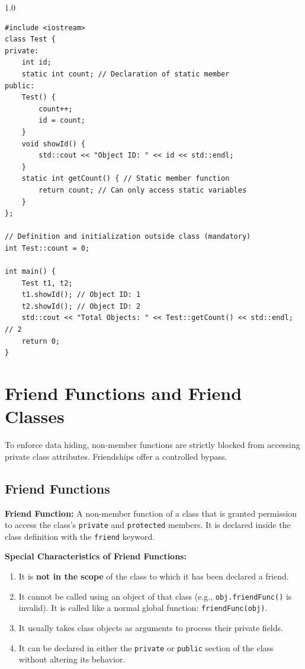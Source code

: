 \documentclass[12pt,a4paper]{article}
\begin{document}
\begin{tcolorbox}[examplebox, title={Code Example: Tracking Object Counts using Static Members}]
\begin{spacing}{1.0}
\begin{verbatim}
#include <iostream>
class Test {
private:
    int id;
    static int count; // Declaration of static member
public:
    Test() {
        count++;
        id = count;
    }
    void showId() {
        std::cout << "Object ID: " << id << std::endl;
    }
    static int getCount() { // Static member function
        return count; // Can only access static variables
    }
};

// Definition and initialization outside class (mandatory)
int Test::count = 0;

int main() {
    Test t1, t2;
    t1.showId(); // Object ID: 1
    t2.showId(); // Object ID: 2
    std::cout << "Total Objects: " << Test::getCount() << std::endl; // 2
    return 0;
}
\end{verbatim}
\end{spacing}
\end{tcolorbox}

\section{Friend Functions and Friend Classes}

To enforce data hiding, non-member functions are strictly blocked from accessing private class attributes. Friendships offer a controlled bypass.

\subsection{Friend Functions}
\begin{tcolorbox}[defbox]
\textbf{Friend Function:} A non-member function of a class that is granted permission to access the class's \texttt{private} and \texttt{protected} members. It is declared inside the class definition with the \texttt{friend} keyword.
\end{tcolorbox}

\textbf{Special Characteristics of Friend Functions:}
\begin{enumerate}[label=\textbf{\alph*.}, leftmargin=1.5em, itemsep=2pt]
  \item It is \textbf{not in the scope} of the class to which it has been declared a friend.
  \item It cannot be called using an object of that class (e.g., \texttt{obj.friendFunc()} is invalid). It is called like a normal global function: \texttt{friendFunc(obj)}.
  \item It usually takes class objects as arguments to process their private fields.
  \item It can be declared in either the \texttt{private} or \texttt{public} section of the class without altering its behavior.
\end{enumerate}
\end{document}
